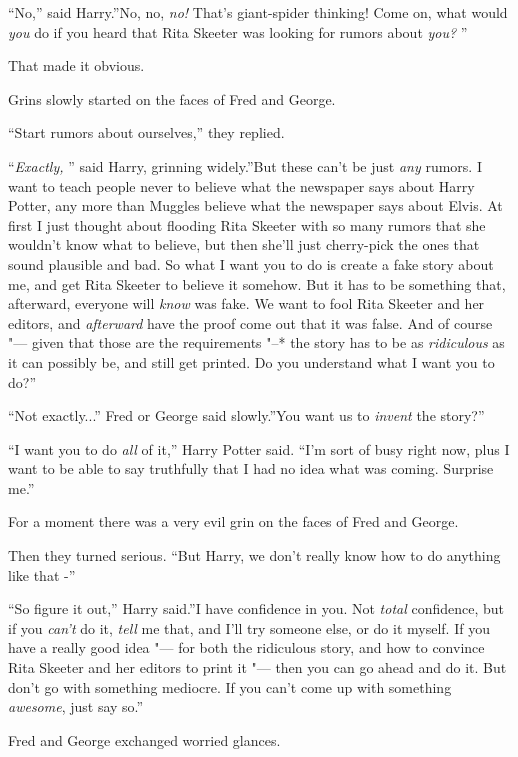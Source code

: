 ``No,'' said Harry.''No, no, \emph{no!} That's giant-spider thinking!
Come on, what would \emph{you} do if you heard that Rita Skeeter was
looking for rumors about \emph{you?} ''

That made it obvious.

Grins slowly started on the faces of Fred and George.

``Start rumors about ourselves,'' they replied.

``\emph{Exactly,} '' said Harry, grinning widely.''But these can't be just
\emph{any} rumors. I want to teach people never to believe what the
newspaper says about Harry Potter, any more than Muggles believe what
the newspaper says about Elvis. At first I just thought about flooding
Rita Skeeter with so many rumors that she wouldn't know what to believe,
but then she'll just cherry-pick the ones that sound plausible and bad.
So what I want you to do is create a fake story about me, and get Rita
Skeeter to believe it somehow. But it has to be something that,
afterward, everyone will \emph{know} was fake. We want to fool Rita
Skeeter and her editors, and \emph{afterward} have the proof come out
that it was false. And of course "--- given that those are the requirements
"--* the story has to be as \emph{ridiculous} as it can possibly be, and
still get printed. Do you understand what I want you to do?''

``Not exactly...'' Fred or George said slowly.''You want us to
\emph{invent} the story?''

``I want you to do \emph{all} of it,'' Harry Potter said. ``I'm sort of
busy right now, plus I want to be able to say truthfully that I had no
idea what was coming. Surprise me.''

For a moment there was a very evil grin on the faces of Fred and George.

Then they turned serious. ``But Harry, we don't really know how to do
anything like that -''

``So figure it out,'' Harry said.''I have confidence in you. Not
\emph{total} confidence, but if you \emph{can't} do it, \emph{tell} me
that, and I'll try someone else, or do it myself. If you have a really
good idea "--- for both the ridiculous story, and how to convince Rita
Skeeter and her editors to print it "--- then you can go ahead and do it.
But don't go with something mediocre. If you can't come up with
something \emph{awesome}, just say so.''

Fred and George exchanged worried glances.

